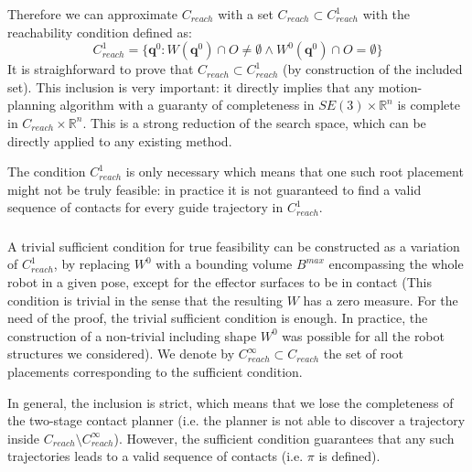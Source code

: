 Therefore we can approximate $C_{reach}$ with a set $C_{reach} \subset C_{reach}^1$ with the reachability condition defined as: 
\begin{equation}
C_{reach}^1 = \{ \mathbf{q}^0 : W(\mathbf{q}^{0}) \cap O \neq \emptyset \wedge W^0(\mathbf{q}^{0}) \cap O = \emptyset \} %
\end{equation}
It is straighforward to prove that  $C_{reach} \subset C_{reach}^1$ (by construction of the included set). 
This inclusion is very important: it directly implies that any motion-planning algorithm with a guaranty of completeness in $SE(3) \times \mathbb{R}^n$ is complete  in $C_{reach} \times \mathbb{R}^n$. This is a strong reduction of the search space, which can be directly applied to any existing method.
 
The condition $C_{reach}^1$ is only necessary which means that one such root placement might not be truly feasible: in practice it is not guaranteed to find a valid sequence of contacts for every guide trajectory in $C_{reach}^1$.

\subsubsection*{}
A trivial sufficient condition for true feasibility can be constructed as a variation of $C_{reach}^1$, by replacing $W^0$ with a bounding volume $B^{max}$ encompassing the whole robot in a given pose, except for the effector surfaces to be in contact (This condition is trivial in the sense that the resulting $W$ has a zero measure. For the need of the proof, the trivial sufficient condition is enough. In practice, the construction of a non-trivial including shape $W^0$ was possible for all the robot structures we considered).  We denote by \mbox{$C_{reach}^\infty \subset C_{reach}$} the set of root placements corresponding to the sufficient condition.

In general, the inclusion is strict, which means that we lose the completeness of the two-stage contact planner (i.e. the planner is not able to discover a trajectory inside \mbox{$C_{reach} \setminus C_{reach}^\infty$}). However, the sufficient condition guarantees that any such trajectories leads to a valid sequence of contacts (i.e. $\pi$ is defined).

